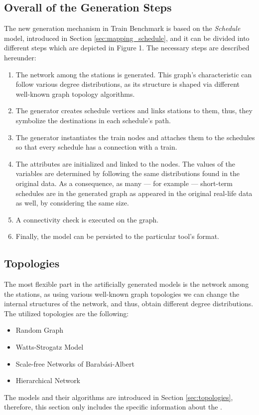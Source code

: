\subsection{Overall of the Generation Steps}
The new generation mechanism in Train Benchmark is based on the \textit{Schedule} model, introduced in Section \ref{sec:mapping_schedule}, and it can be divided into different steps which are depicted in Figure 1. %
The necessary steps are described hereunder:
\begin{enumerate}
	\item The network among the stations is generated. This graph's characteristic can follow various degree distributions, as its structure is shaped via different well-known graph topology algorithms.
	\item The generator creates schedule vertices and links stations to them, thus, they symbolize the destinations in each schedule's path.
	\item The generator instantiates the train nodes and attaches them to the schedules so that every schedule has a connection with a train.
	\item The attributes are initialized and linked to the nodes. The values of the variables are determined by following the same distributions found in the original data. As a consequence, as many --- for example --- short-term schedules are in the generated graph as appeared in the original real-life data as well, by considering the same size.
	\item A connectivity check is executed on the graph.
	\item Finally, the model can be persisted to the particular tool's format.
\end{enumerate}

\subsection{Topologies}
The most flexible part in the artificially generated models is the network among the stations, as using various well-known graph topologies we can change the internal structures of the network, and thus, obtain different degree distributions. The utilized topologies are the following:
\begin{itemize}
	\item Random Graph
	\item Watts-Strogatz Model
	\item Scale-free Networks of Barabási-Albert
	\item Hierarchical Network
\end{itemize}
The models and their algorithms are introduced in Section \ref{sec:topologies}, therefore, this section only includes the specific information about the .

